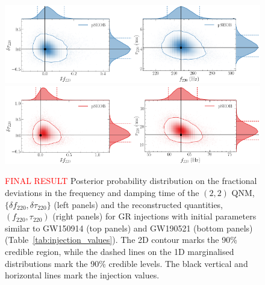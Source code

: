 \documentclass[twocolumn,prd,superscriptaddress,amsfonts,amssymb,amsmath,preprintnumbers]{revtex4-1}
\newcommand{\df}[1]{\delta f_{\text{#1}}}
\newcommand{\dtau}[1]{\delta \tau_{\text{#1}}}
\newcommand{\fngr}[1]{f_{\text{#1}}}
\newcommand{\taungr}[1]{\tau_{\text{#1}}}
\begin{document}
\begin{figure}%
\begin{center}
	\includegraphics[width=0.5\textwidth]{figures/GW150914_simulated_signal_0p0_deltaf220_deltatau220.png}\includegraphics[width=0.5\textwidth]{figures/GW150914_simulated_signal_0p0_f220_tau220.png}	
	\includegraphics[width=0.5\textwidth]{figures/GW190521_simulated_signal_0p0_deltaf220_deltatau220.png}\includegraphics[width=0.5\textwidth]{figures/GW190521_simulated_signal_0p0_f220_tau220.png}		
	\caption{\textcolor{red}{FINAL RESULT} Posterior probability distribution on the fractional deviations in the frequency and damping time of the $(2,2)$ QNM, $\{\df{220},\dtau{220}\}$ (left panels) and the reconstructed quantities, $(\fngr{220}, \taungr{220})$ (right panels) for GR injections with initial parameters similar to GW150914 (top panels) and GW190521 (bottom panels) (Table~\ref{tab:injection_values}). The 2D contour marks the 90\% credible region, while the dashed lines on the 1D marginalised distributions mark the 90\% credible levels. The black vertical and horizontal lines mark the injection values.}
	\label{fig:simulated_signal_GR}
\end{center}
\end{figure}
\end{document}

